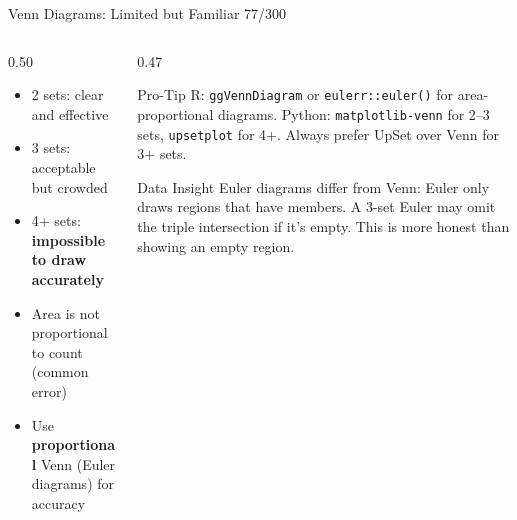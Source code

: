 \documentclass[10pt]{beamer}
\newcommand{\smark}[1]{\hfill{\scriptsize\color{codegray}#1}}
\begin{document}
\begin{frame}{Venn Diagrams: Limited but Familiar}
\smark{77/300}
\begin{columns}[T]
\begin{column}{0.50\textwidth}
\begin{itemize}
    \item 2 sets: clear and effective
    \item 3 sets: acceptable but crowded
    \item 4+ sets: \textbf{impossible to draw accurately}
    \item Area is not proportional to count (common error)
    \item Use \textbf{proportional} Venn (Euler diagrams) for accuracy
\end{itemize}
\end{column}
\begin{column}{0.47\textwidth}
\begin{alertblock}{Pro-Tip}
    \scriptsize R: \texttt{ggVennDiagram} or \texttt{eulerr::euler()} for area-proportional diagrams. Python: \texttt{matplotlib-venn} for 2--3 sets, \texttt{upsetplot} for 4+. Always prefer UpSet over Venn for 3+ sets.
\end{alertblock}
\vspace{0.1cm}
\begin{exampleblock}{Data Insight}
    \scriptsize Euler diagrams differ from Venn: Euler only draws regions that have members. A 3-set Euler may omit the triple intersection if it's empty. This is more honest than showing an empty region.
\end{exampleblock}
\end{column}
\end{columns}
\end{frame}
\end{document}

